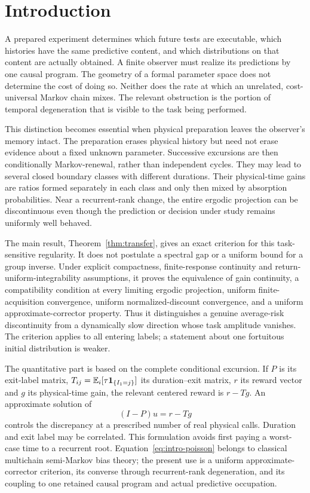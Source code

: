 \section{Introduction}
A prepared experiment determines which future tests are executable, which histories have the same predictive content, and which distributions on that content are actually obtained. A finite observer must realize its predictions by one causal program. The geometry of a formal parameter space does not determine the cost of doing so. Neither does the rate at which an unrelated, cost-universal Markov chain mixes. The relevant obstruction is the portion of temporal degeneration that is visible to the task being performed.

This distinction becomes essential when physical preparation leaves the observer's memory intact. The preparation erases physical history but need not erase evidence about a fixed unknown parameter. Successive excursions are then conditionally Markov-renewal, rather than independent cycles. They may lead to several closed boundary classes with different durations. Their physical-time gains are ratios formed separately in each class and only then mixed by absorption probabilities. Near a recurrent-rank change, the entire ergodic projection can be discontinuous even though the prediction or decision under study remains uniformly well behaved.

The main result, Theorem~\ref{thm:transfer}, gives an exact criterion for this task-sensitive regularity. It does not postulate a spectral gap or a uniform bound for a group inverse. Under explicit compactness, finite-response continuity and return-uniform-integrability assumptions, it proves the equivalence of gain continuity, a compatibility condition at every limiting ergodic projection, uniform finite-acquisition convergence, uniform normalized-discount convergence, and a uniform approximate-corrector property. Thus it distinguishes a genuine average-risk discontinuity from a dynamically slow direction whose task amplitude vanishes. The criterion applies to all entering labels; a statement about one fortuitous initial distribution is weaker.

The quantitative part is based on the complete conditional excursion. If $P$ is its exit-label matrix, $T_{ij}=\mathbb E_i[\tau\mathbf 1_{\{I_1=j\}}]$ its duration--exit matrix, $r$ its reward vector and $g$ its physical-time gain, the relevant centered reward is $r-Tg$. An approximate solution of
\begin{equation}\label{eq:intro-poisson}
 (I-P)u=r-Tg
\end{equation}
controls the discrepancy at a prescribed number of real physical calls. Duration and exit label may be correlated. This formulation avoids first paying a worst-case time to a recurrent root. Equation~\eqref{eq:intro-poisson} belongs to classical multichain semi-Markov bias theory; the present use is a uniform approximate-corrector criterion, its converse through recurrent-rank degeneration, and its coupling to one retained causal program and actual predictive occupation.

